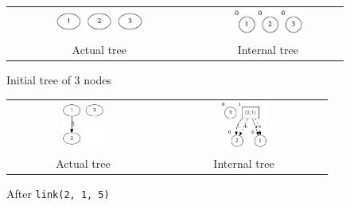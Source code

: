 \documentclass[a4paper, 11pt]{article}
\begin{document}
\begin{figure}[h]
\centering
\begin{tabular}{cc}
  \includegraphics[width=0.5\textwidth]{img/visualisations/test1/1.png} & \includegraphics[width=0.5\textwidth]{img/visualisations/test1/i1.png} \\
  Actual tree & Internal tree \\
\end{tabular}
\caption{Initial tree of 3 nodes}
\label{fig:7}
\end{figure}

\begin{figure}[h]
\centering
\begin{tabular}{cc}
  \includegraphics[width=0.3\textwidth]{img/visualisations/test1/2.png} & \includegraphics[width=0.3\textwidth]{img/visualisations/test1/i2.png} \\
  Actual tree & Internal tree \\
\end{tabular}
\caption{After \texttt{link(2, 1, 5)}}
\label{fig:8}
\end{figure}
\end{document}
